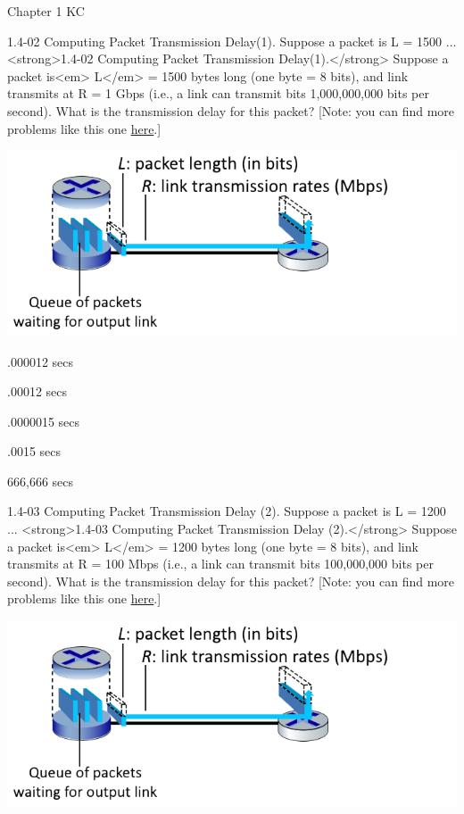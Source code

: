 \documentclass[a4paper]{article}
\begin{document}
\begin{quiz}{Chapter 1 KC}
\begin{multi}[points=1]{1.4-02 Computing Packet Transmission Delay(1). Suppose a packet is L = 1500 ...}
<strong>1.4-02 Computing Packet Transmission Delay(1).</strong> Suppose a packet is<em> L</em> = 1500 bytes long (one byte = 8 bits), and link transmits at R = 1 Gbps (i.e., a link can transmit bits 1,000,000,000 bits per second).  What is the transmission delay for this packet? [Note: you can find more problems like this one \href{http://gaia.cs.umass.edu/kurose_ross/interactive/one-hop-delay.php}{here}.] 
\begin{center}
\includegraphics[width=\linewidth]{figs/1.4.2.png}
\end{center}

\item* .000012 secs
\item .00012 secs
\item .0000015 secs
\item .0015 secs
\item 666,666 secs
\end{multi}

\begin{multi}[points=1]{1.4-03 Computing Packet Transmission Delay (2). Suppose a packet is L = 1200 ...}
<strong>1.4-03 Computing Packet Transmission Delay (2).</strong> Suppose a packet is<em> L</em> = 1200 bytes long (one byte = 8 bits), and link transmits at R = 100 Mbps (i.e., a link can transmit bits 100,000,000 bits per second).  What is the transmission delay for this packet? [Note: you can find more problems like this one \href{http://gaia.cs.umass.edu/kurose_ross/interactive/one-hop-delay.php}{here}.] 
\begin{center}
\includegraphics[width=\linewidth]{figs/1.4.2.png}
\end{center}


\end{multi}
\end{quiz}
\end{document}
